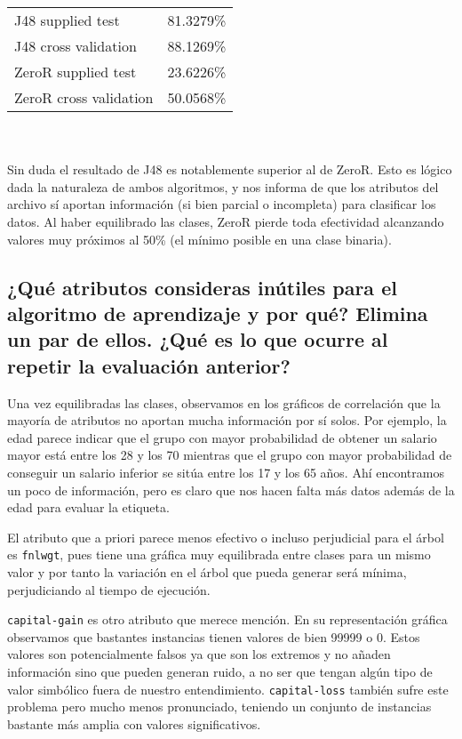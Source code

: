 \documentclass[12pt]{article}
\begin{document}
\begin{tabular}{ll}
    J48 supplied test & 81.3279\%\\
    J48 cross validation & 88.1269\%\\
    ZeroR supplied test & 23.6226\%\\
    ZeroR cross validation & 50.0568\%\\
\end{tabular}
\\ \\
Sin duda el resultado de J48 es notablemente superior al de ZeroR. Esto es lógico dada la naturaleza de ambos algoritmos, y nos informa de que los atributos del archivo sí aportan información (si bien parcial o incompleta) para clasificar los datos. Al haber equilibrado las clases, ZeroR pierde toda efectividad alcanzando valores muy próximos al 50\% (el mínimo posible en una clase binaria).

\subsection*{\small ¿Qué atributos consideras inútiles para el algoritmo de aprendizaje y por qué? Elimina un par de ellos. ¿Qué es lo que ocurre al repetir la evaluación anterior?}

Una vez equilibradas las clases, observamos en los gráficos de correlación que la mayoría de atributos no aportan mucha información por sí solos. Por ejemplo, la edad parece indicar que el grupo con mayor probabilidad de obtener un salario mayor está entre los 28 y los 70 mientras que el grupo con mayor probabilidad de conseguir un salario inferior se sitúa entre los 17 y los 65 años. Ahí encontramos un poco de información, pero es claro que nos hacen falta más datos además de la edad para evaluar la etiqueta.

El atributo que a priori parece menos efectivo o incluso perjudicial para el árbol es \texttt{fnlwgt}, pues tiene una gráfica muy equilibrada entre clases para un mismo valor y por tanto la variación en el árbol que pueda generar será mínima, perjudiciando al tiempo de ejecución.

\texttt{capital-gain} es otro atributo que merece mención. En su representación gráfica observamos que bastantes instancias tienen valores de bien 99999 o 0. Estos valores son potencialmente falsos ya que son los extremos y no añaden información sino que pueden generan ruido, a no ser que tengan algún tipo de valor simbólico fuera de nuestro entendimiento. \texttt{capital-loss} también sufre este problema pero mucho menos pronunciado, teniendo un conjunto de instancias bastante más amplia con valores significativos.
\end{document}
